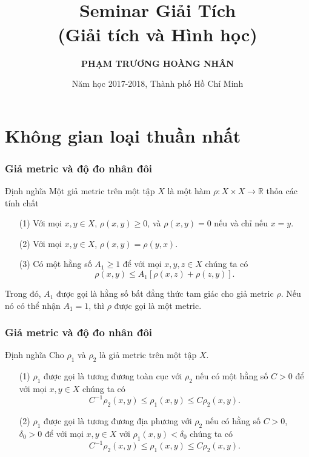\documentclass[11pt]{beamer}
\title[Seminar Giải Tích]{  \\{\bf\huge Seminar Giải Tích}\\(Giải tích và Hình học)}   %
\author{\bf PHẠM TRƯƠNG HOÀNG NHÂN}                 %
\institute{\large \textcolor{red}{SEMINAR GIẢI TÍCH} } %
\date{ Năm học 2017-2018, Thành phố Hồ Chí Minh}
\numberwithin{equation}{section}
\theoremstyle{plain}
\theoremstyle{definition}
\theoremstyle{remark}
\begin{document}
\begin{frame}
  \titlepage
\end{frame}

\section{Không gian loại thuần nhất}

\begin{frame}\frametitle{Giả metric và độ đo nhân đôi}
\begin{block}{Định nghĩa}
Một giả metric trên một tập $X$ là một hàm $\rho:X\times X\to \mathbb{R}$ thỏa các tính chất 
\begin{itemize}
\item[(1)] Với mọi $x,y\in X$, $\rho\left(x,y\right)\geqslant0$, và $\rho\left(x,y\right)=0$ nếu và chỉ nếu $x=y$.
\item[(2)] Với mọi $x,y\in X$, $\rho\left(x,y\right)=\rho\left(y,x\right)$.
\item[(3)] Có một hằng số $A_{1}\geqslant1$ để với mọi $x,y,z\in X$ chúng ta có 
\[\rho\left(x,y\right)\leqslant A_{1}\left[\rho\left(x,z\right)+\rho\left(z,y\right)\right].\]
\end{itemize}
Trong đó, $A_{1}$ được gọi là hằng số bất đẳng thức tam giác cho giả metric $\rho$. Nếu nó có thể nhận $A_{1}=1$, thì $\rho$ được gọi là một metric.
\end{block}
\end{frame}
\begin{frame}\frametitle{Giả metric và độ đo nhân đôi}
\begin{block}{Định nghĩa}
Cho $\rho_{1}$ và $\rho_{2}$ là giả metric trên một tập $X$.
\begin{itemize}
\item[(1)] $\rho_{1}$ được gọi là tương đương toàn cục với $\rho_{2}$ nếu có một hằng số $C>0$ để với mọi $x,y\in X$ chúng ta có 
\[C^{-1}\rho_{2}\left(x,y\right)\leqslant \rho_{1}\left(x,y\right)\leqslant C\rho_{2}\left(x,y\right).\]
\item[(2)] $\rho_{1}$ được gọi là tương đương địa phương với $\rho_{2}$ nếu có hằng số $C>0$, $\delta_{0}>0$ để với mọi $x,y\in X$ với $\rho_{1}\left(x,y\right)<\delta_{0}$ chúng ta có
 \[C^{-1}\rho_{2}\left(x,y\right)\leqslant \rho_{1}\left(x,y\right)\leqslant C\rho_{2}\left(x,y\right).\]
\end{itemize}
\end{block}
\end{frame}
\end{document}
